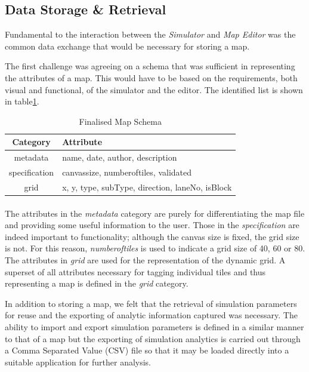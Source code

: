\subsection{Data Storage \& Retrieval}\label{ss:xml}
Fundamental to the interaction between the \textit{Simulator} and \textit{Map Editor} was the common data exchange that would be necessary for storing a map.

The first challenge was agreeing on a schema that was sufficient in representing the attributes of a map.  This would have to be based on the requirements, both visual and functional, of the simulator and the editor.  The identified list is shown in table\ref{ref:mapTable}. 

\begin{table}[h]
\centering
\begin{tabular}{|c|l|}
	\hline
	\textbf{Category} & \textbf{Attribute} \\ \hline
	metadata & name, date, author, description \\ \hline
	specification & canvas\textunderscore size, number\textunderscore of\textunderscore tiles, validated \\ \hline
	grid & x, y, type, subType, direction, laneNo, isBlock \\ \hline
\end{tabular}
\caption{Finalised Map Schema}
\label{ref:mapTable}
\end{table}

\paragraph{}
The attributes in the \textit{metadata} category are purely for differentiating the map file and providing some useful information to the user. Those in the \textit{specification} are indeed important to functionality; although the canvas size is fixed, the grid size is not. For this reason, \textit{number\textunderscore of\textunderscore tiles} is used to indicate a grid size of 40, 60 or 80. The attributes in \textit{grid} are used for the representation of the dynamic grid.  A superset of all attributes necessary for tagging individual tiles and thus representing a map is defined in the \textit{grid} category.

In addition to storing a map, we felt that the retrieval of simulation parameters for reuse and the exporting of analytic information captured was necessary.  The ability to import and export simulation parameters is defined in a similar manner to that of a map but the exporting of simulation analytics is carried out through a Comma Separated Value (CSV) file so that it may be loaded directly into a suitable application for further analysis.

